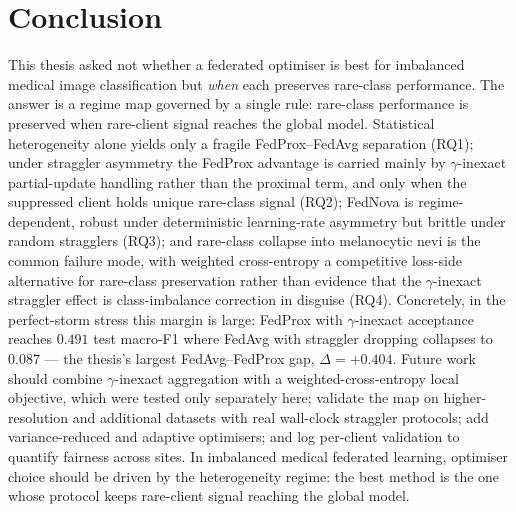 \documentclass[11pt,a4paper]{report}
\begin{document}
\section{Conclusion}
\label{sec:conc}

This thesis asked not whether a federated optimiser is best for imbalanced medical
image classification but \emph{when} each preserves rare-class performance. The
answer is a regime map governed by a single rule: rare-class performance is
preserved when rare-client signal reaches the global model. Statistical
heterogeneity alone yields only a fragile FedProx--FedAvg separation (RQ1); under
straggler asymmetry the FedProx advantage is carried mainly by $\gamma$-inexact
partial-update handling rather than the proximal term, and only when the
suppressed client holds unique rare-class signal (RQ2); FedNova is
regime-dependent, robust under deterministic learning-rate asymmetry but brittle
under random stragglers (RQ3); and rare-class collapse into melanocytic nevi is
the common failure mode, with weighted cross-entropy a competitive loss-side
alternative for rare-class preservation rather than evidence that the
$\gamma$-inexact straggler effect is class-imbalance correction in disguise (RQ4). Concretely, in the
perfect-storm stress this margin is large: FedProx with $\gamma$-inexact
acceptance reaches $0.491$ test macro-F1 where FedAvg with straggler dropping
collapses to $0.087$ --- the thesis's largest FedAvg--FedProx gap, $\Delta =
+0.404$. Future work should combine
$\gamma$-inexact aggregation with a weighted-cross-entropy local objective, which
were tested only separately here; validate the map on higher-resolution and
additional datasets with real wall-clock straggler protocols; add variance-reduced
and adaptive optimisers; and log per-client validation to quantify fairness across
sites. In imbalanced medical federated learning, optimiser choice should be driven by the
heterogeneity regime: the best method is the one whose protocol keeps rare-client
signal reaching the global model.






\appendix
\end{document}
